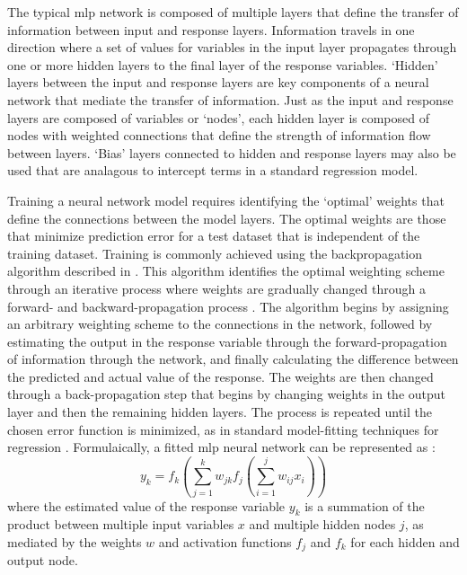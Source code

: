 \documentclass[article,shortnames]{jss}\usepackage[]{graphicx}\usepackage[]{color}
\begin{document}
The typical \ac{mlp} network is composed of multiple layers that define the transfer of information between input and response layers.  Information travels in one direction where a set of values for variables in the input layer propagates through one or more hidden layers to the final layer of the response variables. `Hidden' layers between the input and response layers are key components of a neural network that mediate the transfer of information.  Just as the input and response layers are composed of variables or `nodes', each hidden layer is composed of nodes with weighted connections that define the strength of information flow between layers.  `Bias' layers connected to hidden and response layers may also be used that are analagous to intercept terms in a standard regression model.

Training a neural network model requires identifying the `optimal' weights that define the connections between the model layers.  The optimal weights are those that minimize prediction error for a test dataset that is independent of the training dataset.  Training is commonly achieved using the backpropagation algorithm described in \citep{Rumelhart86}.  This algorithm identifies the optimal weighting scheme through an iterative process where weights are gradually changed through a forward- and backward-propagation process \citep{Rumelhart86,Lek00}.  The algorithm begins by assigning an arbitrary weighting scheme to the connections in the network, followed by estimating the output in the response variable through the forward-propagation of information through the network, and finally calculating the difference between the predicted and actual value of the response.  The weights are then changed through a back-propagation step that begins by changing weights in the output layer and then the remaining hidden layers.  The process is repeated until the chosen error function is minimized, as in standard model-fitting techniques for regression \citep{Cheng94}.  Formulaically, a fitted \ac{mlp} neural network can be represented as \citep{Ripley96}:
\begin{equation}
y_k = f_k \left(\sum\limits_{j=1}^k w_{jk}f_j \left( \sum\limits_{i=1}^j w_{ij}x_i\right) \right)
\end{equation}
where the estimated value of the response variable $y_k$ is a summation of the product between multiple input variables $x$ and multiple hidden nodes $j$, as mediated by the weights $w$ and activation functions $f_j$ and $f_k$ for each hidden and output node.
\end{document}
